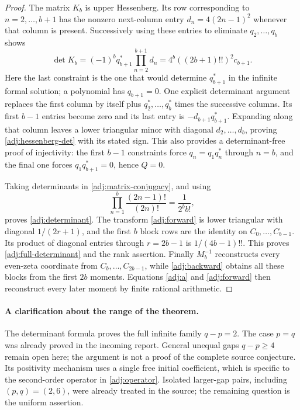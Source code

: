 \begin{proof}
The matrix $K_b$ is upper Hessenberg.  Its row corresponding to
$n=2,\ldots,b+1$ has the nonzero next-column entry
$d_n=4(2n-1)^2$ whenever that column is present.  Successively
using these entries to eliminate $q_2,\ldots,q_b$ shows
\begin{equation}\label{adj:hessenberg-det}
 \det K_b=(-1)^b q_{b+1}^*\prod_{n=2}^{b+1}d_n
 =4^b((2b+1)!!)^2c_{b+1}.
\end{equation}
Here the last constraint is the one that would determine
$q_{b+1}^*$ in the infinite formal solution; a polynomial has
$q_{b+1}=0$.  One explicit determinant argument replaces the first
column by itself plus $q_2^*,\ldots,q_b^*$ times the successive
columns.  Its first $b-1$ entries become zero and its last entry
is $-d_{b+1}q_{b+1}^*$.  Expanding along that column leaves a
lower triangular minor with diagonal $d_2,\ldots,d_b$, proving
\eqref{adj:hessenberg-det} with its stated sign.
This also provides a determinant-free proof of
injectivity: the first $b-1$ constraints force
$q_n=q_1q_n^*$ through $n=b$, and the final one forces
$q_1q_{b+1}^*=0$, hence $Q=0$.

Taking determinants in \eqref{adj:matrix-conjugacy}, and using
\[
 \prod_{n=1}^{b}\frac{(2n-1)!}{(2n)!}=\frac1{2^bb!},
\]
proves \eqref{adj:determinant}.  The transform
\eqref{adj:forward} is lower triangular with diagonal
$1/(2r+1)$, and the first $b$ block rows are the identity on
$C_0,\ldots,C_{b-1}$.  Its product of diagonal entries through
$r=2b-1$ is $1/(4b-1)!!$.  This proves
\eqref{adj:full-determinant} and the rank assertion.  Finally
$M_b^{-1}$ reconstructs every even-zeta coordinate from
$C_b,\ldots,C_{2b-1}$, while \eqref{adj:backward} obtains all
these blocks from the first $2b$ moments.  Equations
\eqref{adj:a} and \eqref{adj:forward} then reconstruct every
later moment by finite rational arithmetic.
\end{proof}

\paragraph{A clarification about the range of the theorem.}
The determinant formula proves the full infinite family $q-p=2$.
The case $p=q$ was already proved in the incoming report.  General
unequal gaps $q-p\ge4$ remain open here; the argument is not a
proof of the complete source conjecture.  Its positivity mechanism
uses a single free initial coefficient, which is specific to the
second-order operator in \eqref{adj:operator}.
Isolated larger-gap pairs, including $(p,q)=(2,6)$, were already
treated in the source; the remaining question is the uniform assertion.

